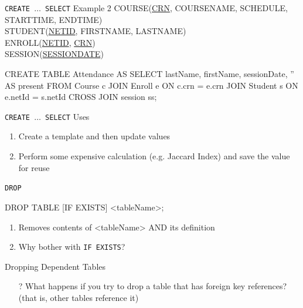 \documentclass[aspectratio=169]{beamer}
\begin{document}
\begin{frame}[fragile]{\texttt{CREATE $\ldots$ SELECT} Example 2}
COURSE(\underline{CRN}, COURSENAME, SCHEDULE, STARTTIME, ENDTIME)\\
STUDENT(\underline{NETID}, FIRSTNAME, LASTNAME)\\
ENROLL(\underline{NETID}, \underline{CRN})\\
SESSION(\underline{SESSIONDATE})\\

\begin{SQL}
CREATE TABLE Attendance AS
SELECT lastName, firstName, sessionDate, '' AS present
FROM Course c 
	JOIN Enroll e ON c.crn = e.crn		
	JOIN Student s ON e.netId = s.netId
	CROSS JOIN session ss;
\end{SQL}
\end{frame}

\begin{frame}[fragile]{\texttt{CREATE $\ldots$ SELECT} Uses}
\begin{enumerate}
\item Create a template and then update values
\item Perform some expensive calculation (e.g. Jaccard Index) and save the value for reuse
\end{enumerate}

\end{frame}

\begin{frame}[fragile]{\texttt{DROP}}

\begin{SQL}
DROP TABLE [IF EXISTS] <tableName>;
\end{SQL}


\begin{enumerate}
\item Removes contents of <tableName> AND its definition
\item Why bother with \texttt{IF EXISTS}?
\end{enumerate}



\end{frame}
\begin{frame}{Dropping Dependent Tables}
\begin{itemize}
\item[?] What happens if you try to drop a table that has foreign key references? (that is, other tables reference it)
\end{itemize}


\end{frame}
\end{document}
